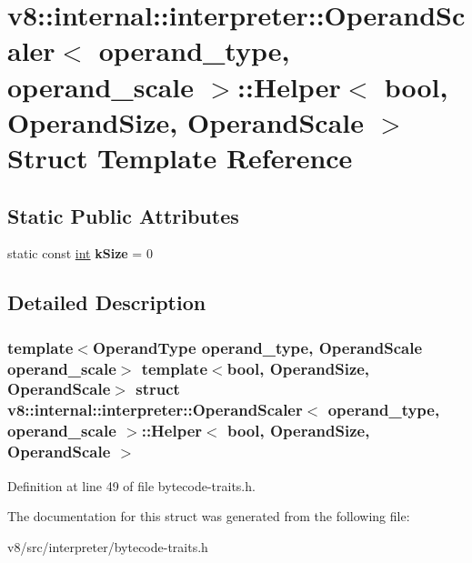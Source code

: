 \hypertarget{structv8_1_1internal_1_1interpreter_1_1OperandScaler_1_1Helper}{}\section{v8\+:\+:internal\+:\+:interpreter\+:\+:Operand\+Scaler$<$ operand\+\_\+type, operand\+\_\+scale $>$\+:\+:Helper$<$ bool, Operand\+Size, Operand\+Scale $>$ Struct Template Reference}
\label{structv8_1_1internal_1_1interpreter_1_1OperandScaler_1_1Helper}
\subsection*{Static Public Attributes}
\begin{DoxyCompactItemize}
\item 
\mbox{\label{structv8_1_1internal_1_1interpreter_1_1OperandScaler_1_1Helper_ad433bb1b2388ca677b065603bdd8f1db}} 
static const \mbox{\hyperlink{classint}{int}} {\bfseries k\+Size} = 0
\end{DoxyCompactItemize}


\subsection{Detailed Description}
\subsubsection*{template$<$Operand\+Type operand\+\_\+type, Operand\+Scale operand\+\_\+scale$>$\newline
template$<$bool, Operand\+Size, Operand\+Scale$>$\newline
struct v8\+::internal\+::interpreter\+::\+Operand\+Scaler$<$ operand\+\_\+type, operand\+\_\+scale $>$\+::\+Helper$<$ bool, Operand\+Size, Operand\+Scale $>$}



Definition at line 49 of file bytecode-\/traits.\+h.



The documentation for this struct was generated from the following file\+:\begin{DoxyCompactItemize}
\item 
v8/src/interpreter/bytecode-\/traits.\+h\end{DoxyCompactItemize}
